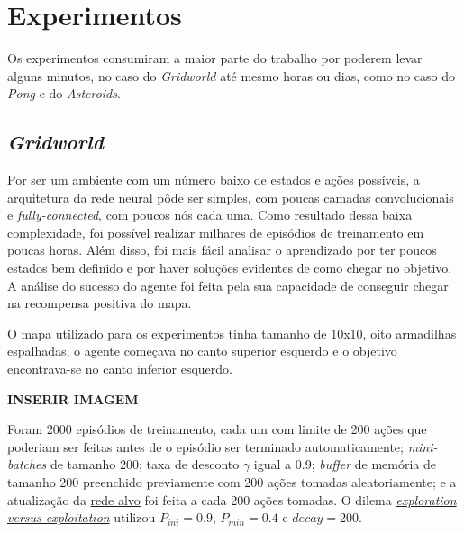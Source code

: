 \section{Experimentos}
\label{sec:exp}

Os experimentos consumiram a maior parte do trabalho por poderem levar alguns minutos, no caso do \textit{Gridworld} até mesmo horas ou dias, como no caso do \textit{Pong} e do \textit{Asteroids}.

\subsection{\textit{Gridworld}}
\label{sec:exp_gridworld}

Por ser um ambiente com um número baixo de estados e ações possíveis, a arquitetura da rede neural pôde ser simples, com poucas camadas convolucionais e \textit{fully-connected}, com poucos nós cada uma.
Como resultado dessa baixa complexidade, foi possível realizar milhares de episódios de treinamento em poucas horas.
Além disso, foi mais fácil analisar o aprendizado por ter poucos estados bem definido e por haver soluções evidentes de como chegar no objetivo.
A análise do sucesso do agente foi feita pela sua capacidade de conseguir chegar na recompensa positiva do mapa.

O mapa utilizado para os experimentos tinha tamanho de 10x10, oito armadilhas espalhadas, o agente começava no canto superior esquerdo e o objetivo encontrava-se no canto inferior esquerdo.

\textbf{INSERIR IMAGEM}

Foram 2000 episódios de treinamento, cada um com limite de 200 ações que poderiam ser feitas antes de o episódio ser terminado automaticamente; \textit{mini-batches} de tamanho 200; taxa de desconto $\gamma$ igual a $0.9$; \textit{buffer} de memória de tamanho 200 preenchido previamente com 200 ações tomadas aleatoriamente; e a atualização da \hyperref[sec:ft]{rede alvo} foi feita a cada 200 ações tomadas.
O dilema \hyperref[eq:exp_exp_prob]{\textit{exploration versus exploitation}} utilizou $P_{ini} = 0.9$, $P_{min} = 0.4$ e $decay = 200$.

